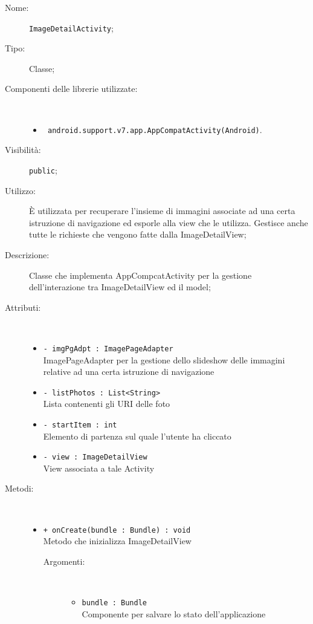 \documentclass[../DefinizioneDiProdotto.tex]{subfiles}
\begin{document}
    \begin{description}
\item[Nome:] \texttt{ImageDetailActivity};
\item[Tipo:] Classe;
\item[Componenti delle librerie utilizzate:] \
\begin{itemize}
\item \texttt{ android.support.v7.app.AppCompatActivity(Android)}.

\end{itemize}
\item[Visibilità:] \texttt{public};
\item[Utilizzo:] È utilizzata per recuperare l'insieme di immagini associate ad una certa istruzione di navigazione ed esporle alla view che le utilizza. Gestisce anche tutte le richieste che vengono fatte dalla ImageDetailView;
\item[Descrizione:] Classe che implementa AppCompcatActivity per la gestione dell'interazione tra ImageDetailView ed il model;
\item[Attributi:] \
\begin{itemize}
\item \texttt{- imgPgAdpt : ImagePageAdapter}\\
ImagePageAdapter per la gestione dello slideshow delle immagini relative ad una certa istruzione di navigazione

\item \texttt{- listPhotos : List<String>}\\
Lista contenenti gli URI delle foto

\item \texttt{- startItem : int}\\
Elemento di partenza sul quale l'utente ha cliccato

\item \texttt{- view : ImageDetailView}\\
View associata a tale Activity

\end{itemize}
\item[Metodi:] \
\begin{itemize}
\item \texttt{+ onCreate(bundle : Bundle) : void}\\
Metodo che inizializza ImageDetailView
 \begin{description}
\item[Argomenti:] \
\begin{itemize}
\item \texttt{bundle : Bundle}\\
Componente per salvare lo stato dell'applicazione\end{itemize}
\end{description}
\end{itemize}
\end{description}
\end{document}
